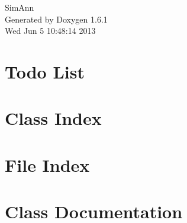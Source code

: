 \documentclass[a4paper]{book}
\begin{document}
\hypersetup{pageanchor=false}
\begin{titlepage}
\vspace*{7cm}
\begin{center}
{\Large SimAnn }\\
\vspace*{1cm}
{\large Generated by Doxygen 1.6.1}\\
\vspace*{0.5cm}
{\small Wed Jun 5 10:48:14 2013}\\
\end{center}
\end{titlepage}
\clearemptydoublepage
{}
\tableofcontents
\clearemptydoublepage
{}
\hypersetup{pageanchor=true}
\chapter{Todo List}
\label{todo}
\hypertarget{todo}{}

\chapter{Class Index}

\chapter{File Index}

\chapter{Class Documentation}














































\end{document}
